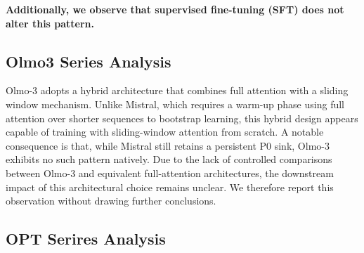 \documentclass[]{template}
\theoremstyle{plain}
\theoremstyle{definition}
\theoremstyle{remark}
\begin{document}
\textbf{Additionally, we observe that supervised fine-tuning (SFT) does not alter this pattern.}















\FloatBarrier

\subsection{Olmo3 Series Analysis}

Olmo-3 adopts a hybrid architecture that combines full attention with a sliding window mechanism. Unlike Mistral, which requires a warm-up phase using full attention over shorter sequences to bootstrap learning, this hybrid design appears capable of training with sliding-window attention from scratch. A notable consequence is that, while Mistral still retains a persistent P0 sink, Olmo-3 exhibits no such pattern natively. Due to the lack of controlled comparisons between Olmo-3 and equivalent full-attention architectures, the downstream impact of this architectural choice remains unclear. We therefore report this observation without drawing further conclusions.



\newpage
\FloatBarrier

\subsection{OPT Serires Analysis}
\end{document}
